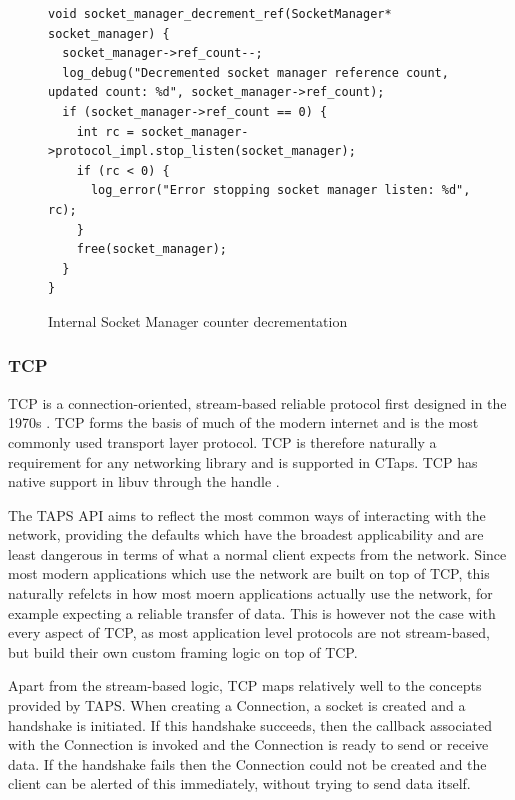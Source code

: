 \begin{figure}[H]
  \begin{verbatim}
void socket_manager_decrement_ref(SocketManager* socket_manager) {
  socket_manager->ref_count--;
  log_debug("Decremented socket manager reference count, updated count: %d", socket_manager->ref_count);
  if (socket_manager->ref_count == 0) {
    int rc = socket_manager->protocol_impl.stop_listen(socket_manager);
    if (rc < 0) {
      log_error("Error stopping socket manager listen: %d", rc);
    }
    free(socket_manager);
  }
}
  \end{verbatim}
  \caption{Internal Socket Manager counter decrementation}
\end{figure}


 
\subsubsection{TCP}
TCP is a connection-oriented, stream-based reliable protocol first designed
in the 1970s \cite{cerfSpecificationInternetTransmission1974}. TCP forms the
basis of much of the modern internet and is the most commonly used transport
layer protocol. TCP is therefore naturally a requirement for any networking
library and is supported in CTaps. TCP has native support in libuv through the
 handle \cite{libuvLibuvTCPHandle}.

The TAPS API aims to reflect the most common ways of interacting with the network,
providing the defaults which have the broadest applicability and are least
dangerous in terms of what a normal client expects from the network. Since
most modern applications which use the network are built on top of TCP,
this naturally refelcts in how most moern applications actually use the
network, for example expecting a reliable transfer of data. This is however
not the case with every aspect of TCP, as most application level protocols
are not stream-based, but build their own custom framing logic on top
of TCP.

Apart from the stream-based logic, TCP maps relatively well to the concepts
provided by TAPS. When creating a Connection, a socket is created and
a handshake is initiated. If this handshake succeeds, then the
 callback associated with the Connection is invoked and
the Connection is ready to send or receive data. If the handshake fails
then the Connection could not be created and the client can be alerted
of this immediately, without trying to send data itself.

